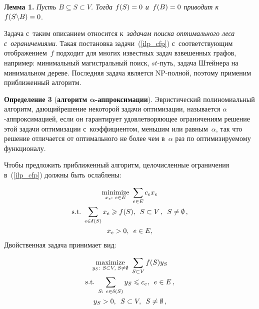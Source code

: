 \begin{multicols}{2}
\smallskip

\noindent
\textbf{Лемма 1.}
\textit{Пусть $B\subseteq S\subset V$. Тогда $f(S) \hm= 0$ и~$f(B) \hm= 0$ приводит к}~$f(S\backslash B) \hm= 0$.

\smallskip

Задача с~таким описанием относится к~\textit{задачам поиска оптимального леса с~ограничениями}. 
Такая постановка задачи~(\ref{ilp_cfp}) с~соответствующим 
отображением~$f$ подходит для многих известных задач взвешенных графов, 
например: минимальный магистральный поиск, $st$-путь, задача Штейнера на 
минимальном дереве. Последняя задача является NP-полной, поэтому применим 
приближенный алгоритм.

\smallskip

\noindent
\textbf{Определение 3} (\textbf{алгоритм $\bm{\alpha}$-аппроксимации}).
Эвристический полиномиальный алгоритм, дающий\linebreak решение некоторой задачи 
оптимизации, называется $\alpha$-ап\-прок\-си\-ма\-ци\-ей, если он гарантирует 
удовлетворяющее ограничениям решение этой задачи оптимизации с~коэффициентом, 
меньшим или равным~$\alpha$, так что решение отличается от оптимального не более 
чем в~$\alpha$ раз по оптимизируемому функционалу.


\smallskip

Чтобы предложить приближенный алгоритм, целочисленные ограничения 
в~(\ref{ilp_cfp}) должны быть ослаблены:

\vspace*{-3pt}

\noindent
\begin{multline*}
\underset{x_e:~e\in E}{\mbox{minimize}}\  \displaystyle \sum\limits_{e\in E}c_ex_e \\
\mbox{s.t.}\  \displaystyle \sum\limits_{e\in \delta(S)}x_e\geqslant f(S),\enskip S \subset V\,, \enskip S \not= \emptyset\,,\\
 x_e>0,\enskip  e\in E,
\end{multline*}
Двойственная задача принимает вид:

\vspace*{-4pt}

\noindent
\begin{multline}
\underset{y_S:~S \subset V, \; S \not= \emptyset}{\mbox{maximize}}\  
\displaystyle \sum\limits_{S\subset V}f(S)y_S \\
\mbox{s.t.}\  \displaystyle \sum\limits_{S:~e\in \delta(S)}y_S\leqslant c_e,\enskip  e\in E\,,\\
 y_S>0,\enskip  S \subset V, \enskip S \not= \emptyset\,,
\label{rd_cfp}
\end{multline}


\end{multicols}
